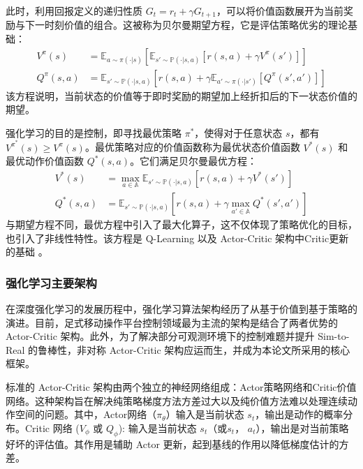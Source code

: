 此时，利用回报定义的递归性质 $G_t = r_t + \gamma G_{t+1}$，可以将价值函数展开为当前奖励与下一时刻价值的组合。这被称为贝尔曼期望方程，它是评估策略优劣的理论基础：
\begin{equation}
    \begin{aligned}
        V^\pi(s)    & = \mathbb{E}_{a \sim \pi(\cdot|s)} \left[ \mathbb{E}_{s' \sim \mathbb{P}(\cdot|s, a)} \left[ r(s,a) + \gamma V^\pi(s') \right] \right] \\
        Q^\pi(s, a) & = \mathbb{E}_{s' \sim \mathbb{P}(\cdot|s, a)} \left[ r(s,a) + \gamma \mathbb{E}_{a' \sim \pi(\cdot|s')} [Q^\pi(s', a')] \right]
    \end{aligned}
    \label{eq:bellman_expectation}
\end{equation}
该方程说明，当前状态的价值等于即时奖励的期望加上经折扣后的下一状态价值的期望。

强化学习的目的是控制，即寻找最优策略 $\pi^*$，使得对于任意状态 $s$，都有 $V^{\pi^*}(s) \geq V^\pi(s)$。最优策略对应的价值函数称为最优状态价值函数 $V^*(s)$ 和最优动作价值函数 $Q^*(s, a)$。它们满足贝尔曼最优方程：
\begin{equation}
    \begin{aligned}
        V^*(s)    & = \max_{a \in \mathbb{A}} \mathbb{E}_{s' \sim \mathbb{P}(\cdot|s, a)} \left[ r(s,a) + \gamma V^*(s') \right]      \\
        Q^*(s, a) & = \mathbb{E}_{s' \sim \mathbb{P}(\cdot|s, a)} \left[ r(s,a) + \gamma \max_{a' \in \mathbb{A}} Q^*(s', a') \right]
    \end{aligned}
    \label{eq:bellman_optimality}
\end{equation}
与期望方程不同，最优方程中引入了最大化算子，这不仅体现了策略优化的目标，也引入了非线性特性。该方程是 Q-Learning\cite{watkins1992} 以及 Actor-Critic\cite{actorcritic1999} 架构中Critic更新的基础 。

\subsubsection{强化学习主要架构}

在深度强化学习的发展历程中，强化学习算法架构经历了从基于价值到基于策略的演进。目前，足式移动操作平台控制领域最为主流的架构是结合了两者优势的 Actor-Critic 架构。此外，为了解决部分可观测环境下的控制难题并提升 Sim-to-Real 的鲁棒性，非对称 Actor-Critic\cite{pinto2017asymmetricactorcriticimagebased} 架构应运而生，并成为本论文所采用的核心框架。

标准的 Actor-Critic 架构由两个独立的神经网络组成：Actor策略网络和Critic价值网络。这种架构旨在解决纯策略梯度方法方差过大以及纯价值方法难以处理连续动作空间的问题。其中，Actor网络（$\pi_{\theta}$）输入是当前状态 $s_t$，输出是动作的概率分布。Critic 网络 ($V_\phi$ 或 $Q_\phi$): 输入是当前状态 $s_t$（或$s_t$， $a_t$），输出是对当前策略好坏的评估值。其作用是辅助 Actor 更新，起到基线的作用以降低梯度估计的方差。

